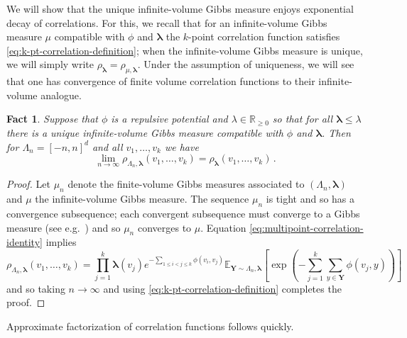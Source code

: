 \documentclass[10pt]{amsart}
\newtheorem{fact}[theorem]{Fact}
\theoremstyle{definition}
\theoremstyle{remark}
\newcommand{\bY}{\mathbf{Y}}
\newcommand{\blambda}{{\boldsymbol{\lambda}}}
\newcommand{\E}{\mathbb{E}}
\newcommand{\R}{\mathbb{R}}
\begin{document}
	We will show that the unique infinite-volume Gibbs measure enjoys exponential decay of correlations.  For this, we recall that for an infinite-volume Gibbs measure $\mu$ compatible with $\phi$ and $\blambda$ the $k$-point correlation function satisfies \eqref{eq:k-pt-correlation-definition}; when the infinite-volume Gibbs measure is unique, we will simply write $\rho_{\blambda} = \rho_{\mu,\blambda}$.  Under the assumption of uniqueness, we will see that one has convergence of finite volume correlation functions to their infinite-volume analogue.
	\begin{fact}\label{fact:convergence-corr-fcns}
		Suppose that $\phi$ is a repulsive potential and $\lambda \in \R_{\geq 0}$ so that for all $\blambda \leq \lambda$ there is a unique infinite-volume Gibbs measure compatible with $\phi$ and $\blambda$.  Then for $\Lambda_n = [-n,n]^d$ and all $v_1,\ldots,v_k$ we have \begin{equation*}
			\lim_{n \to \infty} \rho_{\Lambda_n,\blambda}(v_1,\ldots,v_k) = \rho_{\blambda}(v_1,\ldots,v_k)\,.
		\end{equation*}
	\end{fact}
	\begin{proof}
		Let $\mu_n$ denote the finite-volume Gibbs measures associated to $(\Lambda_n,\blambda)$ and $\mu$ the infinite-volume Gibbs measure.  The sequence $\mu_n$ is tight and so has a convergence subsequence; each convergent subsequence must converge to a Gibbs measure (see e.g.\ \cite[Theorem~5.7]{jansen2018gibbsian}) and so $\mu_n$ converges to $\mu$.  Equation \eqref{eq:multipoint-correlation-identity} implies $$ \rho_{\Lambda_n,\blambda}(v_1,\ldots,v_k) = \prod_{j = 1}^k \blambda(v_j)  e^{- \sum_{1 \leq i < j \leq k} \phi(v_i,v_j)} \E_{\bY \sim \Lambda_n,\blambda} \left[\exp\left(- \sum_{j = 1}^k \sum_{y \in \bY} \phi(v_j,y) \right) \right]$$ and so taking $n \to \infty$ and using \eqref{eq:k-pt-correlation-definition} completes the proof.
	\end{proof}
	
	Approximate factorization of correlation functions follows quickly.
	
\end{document}

